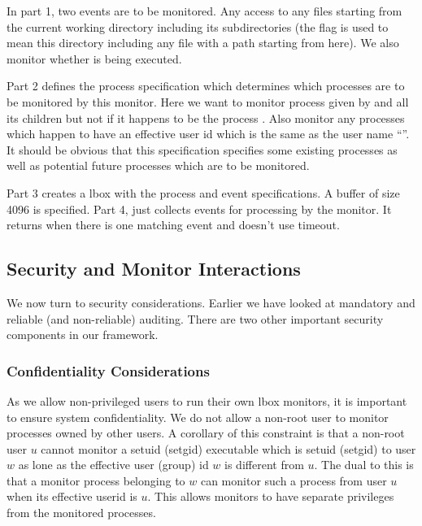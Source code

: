 In part 1, two events are to be monitored. Any access to any files
starting from the current working directory including its subdirectories
(the  flag is used to mean 
this directory including any file with a path starting from here).
We also monitor whether  is being executed.

Part 2 defines the process specification which determines which processes
are to be monitored by this monitor.
Here we want to monitor process given by  and all its children
but not if it happens to be the process .
Also monitor any processes which happen to have an effective user
id which is the same as the user name ``''.
It should be obvious that this specification specifies some existing
processes as well as potential future processes which are to be monitored.

Part 3 creates a lbox with the process and event specifications.
A buffer of size 4096 is specified.
Part 4, just collects events for processing by the monitor.
It returns when there is one matching event and doesn't use timeout.



\subsection{Security and Monitor Interactions}

We now turn to security considerations. Earlier we have looked
at mandatory and reliable (and non-reliable) auditing.
There are two other important security components in our framework.

\subsubsection{Confidentiality Considerations}
As we allow non-privileged users to run their own lbox monitors,
it is important to ensure system confidentiality. 
We do not allow a non-root user to monitor processes owned by other users.
A corollary of this constraint is that
a non-root user $u$ cannot monitor a setuid (setgid) executable
which is setuid (setgid) to user $w$ as lone as the effective user (group) id
$w$ is different from $u$.
The dual to this is that a monitor process belonging to $w$ can monitor
such a process from user $u$ when its effective userid is $u$.
This allows monitors to have separate privileges from the monitored
processes.

